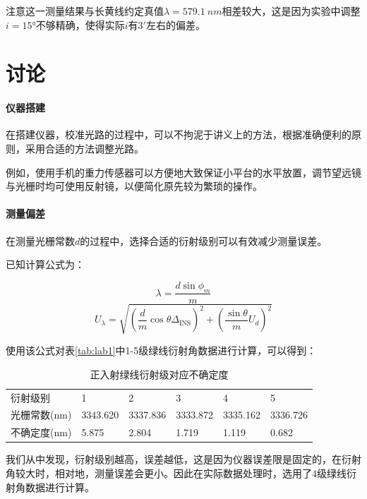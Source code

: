 \documentclass[UTF8,a4paper]{article}%
\begin{document}
注意这一测量结果与长黄线约定真值$\lambda=\qty{579.1}{nm}$相差较大，这是因为实验中调整$i=\ang{15}$不够精确，使得实际$i$有$\ang{;3}$左右的偏差。
\section{讨论}
\paragraph{仪器搭建}
在搭建仪器，校准光路的过程中，可以不拘泥于讲义上的方法，根据准确便利的原则，采用合适的方法调整光路。

例如，使用手机的重力传感器可以方便地大致保证小平台的水平放置，调节望远镜与光栅时均可使用反射镜，以便简化原先较为繁琐的操作。
\paragraph{测量偏差}
在测量光栅常数$d$的过程中，选择合适的衍射级别可以有效减少测量误差。

已知计算公式为：

$$\lambda=\frac{d\sin\phi_{m}}{m}$$
$$U_\lambda=\sqrt{\left(\frac{d}{m}\cos\theta\Delta_\mathrm{INS}\right)^2+\left(\frac{\sin\theta}{m}U_d\right)^2}$$

使用该公式对表\ref{tab:lab1}中1-5级绿线衍射角数据进行计算，可以得到：
\begin{table}[H]
    \centering
    \caption{正入射绿线衍射级对应不确定度}
    \begin{tabular}{llllll}
        \hline
        衍射级别                & 1        & 2        & 3        & 4        & 5        \\
        光栅常数($\mathrm{nm}$) & 3343.620 & 3337.836 & 3333.872 & 3335.162 & 3336.726 \\
        不确定度($\mathrm{nm}$) & 5.875    & 2.804    & 1.719    & 1.119    & 0.682    \\               \hline
    \end{tabular}
\end{table}
我们从中发现，衍射级别越高，误差越低，这是因为仪器误差限是固定的，在衍射角较大时，相对地，测量误差会更小。因此在实际数据处理时，选用了4级绿线衍射角数据进行计算。
\appendix
\end{document}
